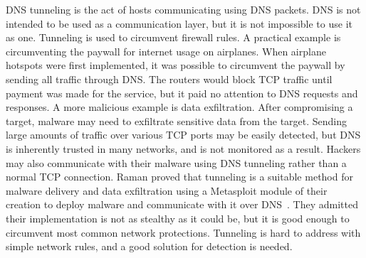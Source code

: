 DNS tunneling is the act of hosts communicating using DNS packets.
DNS is not intended to be used as a communication layer, but it is not impossible to use it as one.
Tunneling is used to circumvent firewall rules.
A practical example is circumventing the paywall for internet usage on airplanes.
When airplane hotspots were first implemented, it was possible to circumvent the paywall by sending
all traffic through DNS.
The routers would block TCP traffic until payment was made for the service, but it paid no attention
to DNS requests and responses.
A more malicious example is data exfiltration.
After compromising a target, malware may need to exfiltrate sensitive data from the target.
Sending large amounts of traffic over various TCP ports may be easily detected, but DNS is inherently
trusted in many networks, and is not monitored as a result.
Hackers may also communicate with their malware using DNS tunneling rather than a normal TCP
connection.
Raman \etal{} proved that tunneling is a suitable method for malware delivery and data exfiltration
using a Metasploit module of their creation to deploy malware and communicate with it over DNS~\cite{tunnelpenetrate}.
They admitted their implementation is not as stealthy as it could be, but it is good enough to
circumvent most common network protections.
Tunneling is hard to address with simple network rules, and a good solution for detection is needed.
